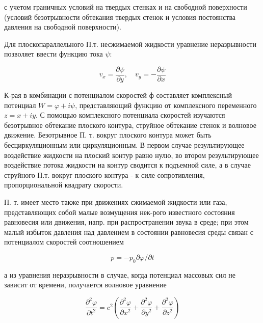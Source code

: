 \documentclass[10pt]{article}
\begin{document}
с учетом граничных условий на твердых стенках и на свободной поверхности (условий безотрывности обтекания твердых стенок и условия постоянства давления на свободной поверхности).



Для плоскопараллельного П.т. несжимаемой жидкости уравнение неразрывности позволяет ввести функцию тока $\psi:$



\[

v_{x}=\frac{\partial \psi}{\partial y}, \quad v_{y}=-\frac{\partial \psi}{\partial x}

\]



К-рая в комбинации с потенциалом скоростей $ф$ составляет комплексный потенциал $W=\varphi+i \psi$, представляющий функцию от комплексного переменного $z=x+i y$. С помощью комплексного потенциала скоростей изучаются безотрывное обтекание плоского контура, струйное обтекание стенок и волновое движение. Безотрывное П. т. вокруг плоского контура может быть бесциркуляционным или циркуляционным. В первом случае результирующее воздействие жидкости на плоский контур равно нулю, во втором результирующее воздействие потока жидкости на контур сводится к подъемной силе, а в случае струйного П.т. вокруг плоского контура - к силе сопротивления, пропорциональной квадрату скорости.



П. т. имеет место также при движениях сжимаемой жидкости или газа, представляющих собой малые возмущения нек-рого известного состояния равновесия или движения, напр. при распространении звука в среде; при этом малый избыток давления над давлением в состоянии равновесия среды связан с потенциалом скоростей соотношением



\[

p=-p_{0} \partial \varphi / \partial t

\]



а из уравнения неразрывности в случае, когда потенциал массовых сил не зависит от времени, получается волновое уравнение



\[

\frac{\partial^{2} \varphi}{\partial t^{2}}=c^{2}\left(\frac{\partial^{2} \varphi}{\partial x^{2}}+\frac{\partial^{2} \varphi}{\partial y^{2}}+\frac{\partial^{2} \varphi}{\partial z^{2}}\right)

\]
\end{document}
